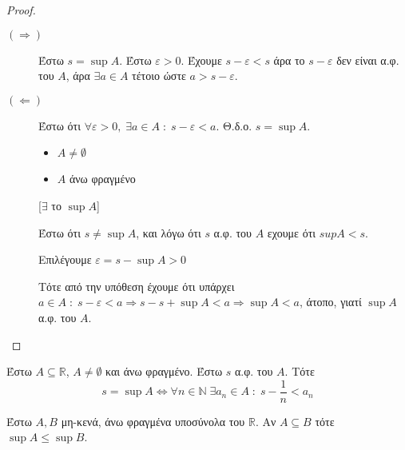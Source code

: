 \documentclass[main.tex]{subfiles}
\begin{document}
 \begin{proof}
 \item {}
     \begin{description}
         \item[$ (\Rightarrow) $] 
             Έστω $ s = \sup A $. Έστω $ \varepsilon >0 $. Έχουμε $ 
             s - \varepsilon < s $ άρα το $ s- \varepsilon $ δεν είναι 
             α.φ. του $A$, άρα $ \exists a \in A $ τέτοιο ώστε $ 
             a > s- \varepsilon$. 

         \item [$ (\Leftarrow) $] 
             Έστω ότι $ \forall \varepsilon >0, \; \exists a \in A \; : 
             \; s- \varepsilon < a$. Θ.δ.ο. $ s = \sup A $. 


             \begin{minipage}{0.23\textwidth}
                 \begin{itemize}
                     \item $ A \neq \emptyset $ \hfill {}
                     \item $ A $ άνω φραγμένο \hfill  {}
                 \end{itemize}
             \end{minipage}

             [$ \exists $ το $ \sup A $]

             Έστω ότι $ s \neq \sup A $, και λόγω ότι $ s $ α.φ. του $A$ 
             εχουμε ότι $sup A < s $. 

             Επιλέγουμε $ \varepsilon = s - \sup A > 0 $

             Τότε από την υπόθεση έχουμε ότι 
             υπάρχει $ a \in A \; : \; s - \varepsilon < a \Rightarrow s 
             - s + \sup A < a \Rightarrow \sup A < a $, άτοπο, γιατί 
             $ \sup A $ α.φ. του $A$.  
     \end{description} 
 \end{proof}

 \begin{prop}
Έστω $ A \subseteq \mathbb{R} $, $ A \neq \emptyset $ και άνω φραγμένο. 
Έστω $ s $ α.φ. του $A$. Τότε 
\[
    s = \sup A \Leftrightarrow \forall n \in \mathbb{N} \; \exists a_{n} \in A
    \; : \; s - \frac{1}{n} < a_{n} 
 \] 
 \end{prop}
 

\begin{prop}\label{prop:leqsup}
    Έστω $ A, B $ μη-κενά, άνω φραγμένα υποσύνολα του $ \mathbb{R} $. Αν $ A \subseteq 
    B$ τότε $ \sup A \leq \sup B $.
\end{prop}
\end{document}
